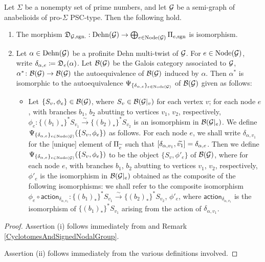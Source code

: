 \begin{lem}\label{DescriptionOfDehnMultiTwists}
  Let $\Sigma$ be a nonempty set of prime numbers, and let $\mathcal{G}$ be a semi-graph of anabelioids of pro-$\Sigma$ PSC-type. Then the following hold.
  \begin{enumerate}
    \item The morphism $\mathfrak{D}_{\mathcal{G}, \mathrm{sgn.}} : \mathrm{Dehn}(\mathcal{G}) \to \bigoplus_{e \in \mathrm{Node}(\mathcal{G})} \Pi_{e, \mathrm{sgn}}$ is isomorphism.
    \item Let $\alpha \in \mathrm{Dehn}(\mathcal{G})$ be a profinite Dehn multi-twist of $\mathcal{G}$. For $e \in \mathrm{Node}(\mathcal{G})$, write $\delta_{\alpha, e} \coloneqq \mathfrak{D}_{e}(\alpha)$. Let $\mathcal{B}(\mathcal{G})$ be the Galois category associated to $\mathcal{G}$, $\alpha^* \colon \mathcal{B}(\mathcal{G}) \to \mathcal{B}(\mathcal{G})$ the autoequivalence of $\mathcal{B}(\mathcal{G})$ induced by $\alpha$. Then $\alpha^*$ is isomorphic to the autoequivalence $\Psi_{\{\delta_{\alpha, e}\}_{e \in \mathrm{Node}(\mathcal{G})}}$ of $\mathcal{B}(\mathcal{G})$ given as follows:
    \begin{itemize}
      \item Let $\{S_v, \phi_e\} \in \mathcal{B}(\mathcal{G})$, where $S_v \in \mathcal{B}(\mathcal{G}|_v)$ for each vertex $v$; for each node $e$, with branches $b_1$, $b_2$ abutting to vertices $v_1$, $v_2$, respectively, $\phi_e \colon \{(b_1)_*\}^*S_{v_1} \xrightarrow{\sim} \{(b_2)_*\}^*S_{v_2}$ is an isomorphism in $\mathcal{B}(\mathcal{G}|_e)$. We define $\Psi_{\{\delta_{\alpha, e}\}_{e \in \mathrm{Node}(\mathcal{G})}}(\{S_v, \phi_e\})$ as follows. For each node $e$, we shall write $\delta_{\alpha, v_1}$ for the [unique] element of $\Pi_{\widetilde{e}}$ such that $[\delta_{\alpha, v_1}, \widetilde{v_1}] = \delta_{\alpha, e}$. Then we define $\Psi_{\{\delta_{\alpha, e}\}_{e \in \mathrm{Node}(\mathcal{G})}}(\{S_v, \phi_e\})$ to be the object $\{S_v, \phi'_e\}$ of $\mathcal{B}(\mathcal{G})$, where for each node $e$, with branches $b_1$, $b_2$ abutting to vertices $v_1$, $v_2$, respectively, $\phi'_e$ is the isomorphism in $\mathcal{B}(\mathcal{G}|_e)$ obtained as the composite of the following isomorphisms: we shall refer to the composite isomorphism $\phi_e \circ \mathsf{action}_{\delta_{\alpha, v_1}} \colon \{(b_1)_*\}^*S_{v_1} \xrightarrow{\sim} \{(b_2)_*\}^*S_{v_2}$, $\phi'_e$, where $\mathsf{action}_{\delta_{\alpha, v_1}}$ is the isomorphism of $\{(b_1)_*\}^*S_{v_1}$ arising from the action of $\delta_{\alpha, v_1}$.
    \end{itemize}
  \end{enumerate}
\end{lem}
\begin{proof}
  Assertion (i) follows immediately from \cite[Theorem 4.8, (iv)]{CbTpI} and Remark \ref{CyclotomesAndSignedNodalGroup}.

  Assertion (ii) follows immediately from the various definitions involved.
\end{proof}

